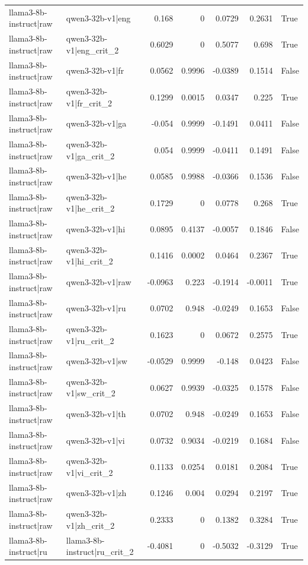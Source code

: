 \begin{table}
\begin{tabular}{l l r r r r l}
llama3-8b-instruct|raw & qwen3-32b-v1|eng & 0.168 & 0 & 0.0729 & 0.2631 & True \\
llama3-8b-instruct|raw & qwen3-32b-v1|eng_crit_2 & 0.6029 & 0 & 0.5077 & 0.698 & True \\
llama3-8b-instruct|raw & qwen3-32b-v1|fr & 0.0562 & 0.9996 & -0.0389 & 0.1514 & False \\
llama3-8b-instruct|raw & qwen3-32b-v1|fr_crit_2 & 0.1299 & 0.0015 & 0.0347 & 0.225 & True \\
llama3-8b-instruct|raw & qwen3-32b-v1|ga & -0.054 & 0.9999 & -0.1491 & 0.0411 & False \\
llama3-8b-instruct|raw & qwen3-32b-v1|ga_crit_2 & 0.054 & 0.9999 & -0.0411 & 0.1491 & False \\
llama3-8b-instruct|raw & qwen3-32b-v1|he & 0.0585 & 0.9988 & -0.0366 & 0.1536 & False \\
llama3-8b-instruct|raw & qwen3-32b-v1|he_crit_2 & 0.1729 & 0 & 0.0778 & 0.268 & True \\
llama3-8b-instruct|raw & qwen3-32b-v1|hi & 0.0895 & 0.4137 & -0.0057 & 0.1846 & False \\
llama3-8b-instruct|raw & qwen3-32b-v1|hi_crit_2 & 0.1416 & 0.0002 & 0.0464 & 0.2367 & True \\
llama3-8b-instruct|raw & qwen3-32b-v1|raw & -0.0963 & 0.223 & -0.1914 & -0.0011 & True \\
llama3-8b-instruct|raw & qwen3-32b-v1|ru & 0.0702 & 0.948 & -0.0249 & 0.1653 & False \\
llama3-8b-instruct|raw & qwen3-32b-v1|ru_crit_2 & 0.1623 & 0 & 0.0672 & 0.2575 & True \\
llama3-8b-instruct|raw & qwen3-32b-v1|sw & -0.0529 & 0.9999 & -0.148 & 0.0423 & False \\
llama3-8b-instruct|raw & qwen3-32b-v1|sw_crit_2 & 0.0627 & 0.9939 & -0.0325 & 0.1578 & False \\
llama3-8b-instruct|raw & qwen3-32b-v1|th & 0.0702 & 0.948 & -0.0249 & 0.1653 & False \\
llama3-8b-instruct|raw & qwen3-32b-v1|vi & 0.0732 & 0.9034 & -0.0219 & 0.1684 & False \\
llama3-8b-instruct|raw & qwen3-32b-v1|vi_crit_2 & 0.1133 & 0.0254 & 0.0181 & 0.2084 & True \\
llama3-8b-instruct|raw & qwen3-32b-v1|zh & 0.1246 & 0.004 & 0.0294 & 0.2197 & True \\
llama3-8b-instruct|raw & qwen3-32b-v1|zh_crit_2 & 0.2333 & 0 & 0.1382 & 0.3284 & True \\
llama3-8b-instruct|ru & llama3-8b-instruct|ru_crit_2 & -0.4081 & 0 & -0.5032 & -0.3129 & True \\

\end{tabular}
\end{table}
